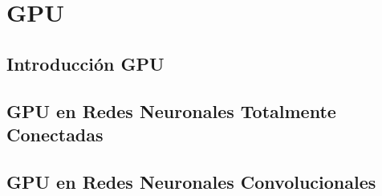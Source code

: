 \chapter{GPU}

\section{Introducción GPU}
\section{GPU en Redes Neuronales Totalmente Conectadas}
\section{GPU en Redes Neuronales Convolucionales}